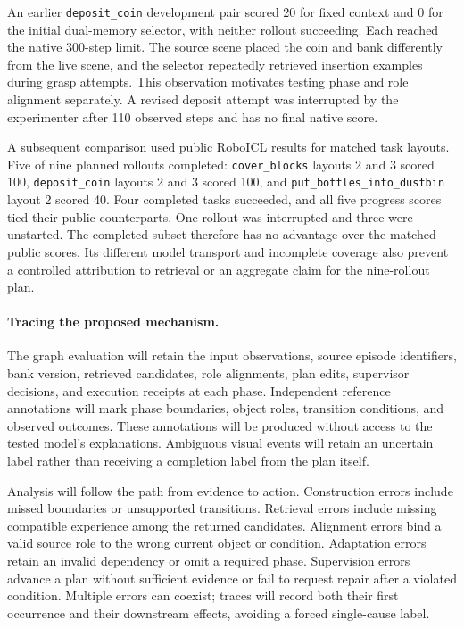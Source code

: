 \documentclass[10pt,twocolumn,letterpaper]{article}
\begin{document}
An earlier \texttt{deposit\_coin} development pair scored 20 for fixed context and 0 for the initial dual-memory selector, with neither rollout succeeding. Each reached the native 300-step limit. The source scene placed the coin and bank differently from the live scene, and the selector repeatedly retrieved insertion examples during grasp attempts. This observation motivates testing phase and role alignment separately. A revised deposit attempt was interrupted by the experimenter after 110 observed steps and has no final native score.

A subsequent comparison used public RoboICL results for matched task layouts. Five of nine planned rollouts completed: \texttt{cover\_blocks} layouts 2 and 3 scored 100, \texttt{deposit\_coin} layouts 2 and 3 scored 100, and \texttt{put\_bottles\_into\_dustbin} layout 2 scored 40. Four completed tasks succeeded, and all five progress scores tied their public counterparts. One rollout was interrupted and three were unstarted. The completed subset therefore has no advantage over the matched public scores. Its different model transport and incomplete coverage also prevent a controlled attribution to retrieval or an aggregate claim for the nine-rollout plan.

\paragraph{Tracing the proposed mechanism.}
The graph evaluation will retain the input observations, source episode identifiers, bank version, retrieved candidates, role alignments, plan edits, supervisor decisions, and execution receipts at each phase. Independent reference annotations will mark phase boundaries, object roles, transition conditions, and observed outcomes. These annotations will be produced without access to the tested model's explanations. Ambiguous visual events will retain an uncertain label rather than receiving a completion label from the plan itself.

Analysis will follow the path from evidence to action. Construction errors include missed boundaries or unsupported transitions. Retrieval errors include missing compatible experience among the returned candidates. Alignment errors bind a valid source role to the wrong current object or condition. Adaptation errors retain an invalid dependency or omit a required phase. Supervision errors advance a plan without sufficient evidence or fail to request repair after a violated condition. Multiple errors can coexist; traces will record both their first occurrence and their downstream effects, avoiding a forced single-cause label.
\end{document}
